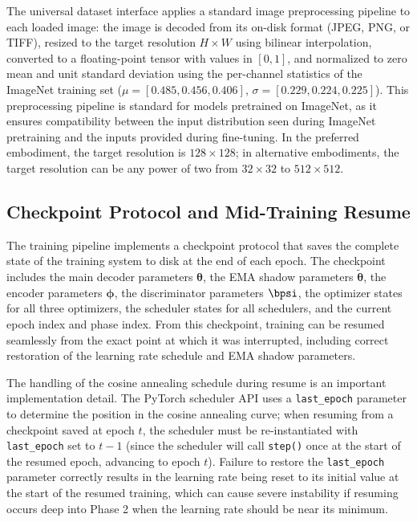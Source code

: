 \documentclass[12pt,letterpaper]{article}
\newcommand{\btheta}{\bm{\theta}}
\newcommand{\bphi}{\bm{\phi}}
\begin{document}
The universal dataset interface applies a standard image preprocessing pipeline
to each loaded image: the image is decoded from its on-disk format (JPEG, PNG,
or TIFF), resized to the target resolution $H \times W$ using bilinear
interpolation, converted to a floating-point tensor with values in $[0,1]$,
and normalized to zero mean and unit standard deviation using the per-channel
statistics of the ImageNet training set ($\mu = [0.485, 0.456, 0.406]$,
$\sigma = [0.229, 0.224, 0.225]$). This preprocessing pipeline is standard for
models pretrained on ImageNet, as it ensures compatibility between the input
distribution seen during ImageNet pretraining and the inputs provided during
fine-tuning. In the preferred embodiment, the target resolution is $128 \times
128$; in alternative embodiments, the target resolution can be any power of two
from $32 \times 32$ to $512 \times 512$.

\subsection{Checkpoint Protocol and Mid-Training Resume}

The training pipeline implements a checkpoint protocol that saves the complete
state of the training system to disk at the end of each epoch. The checkpoint
includes the main decoder parameters $\btheta$, the EMA shadow parameters
$\tilde{\btheta}$, the encoder parameters $\bphi$, the discriminator parameters
$\bpsi$, the optimizer states for all three optimizers, the scheduler states
for all schedulers, and the current epoch index and phase index. From this
checkpoint, training can be resumed seamlessly from the exact point at which
it was interrupted, including correct restoration of the learning rate schedule
and EMA shadow parameters.

The handling of the cosine annealing schedule during resume is an important
implementation detail. The PyTorch scheduler API uses a \texttt{last\_epoch}
parameter to determine the position in the cosine annealing curve; when
resuming from a checkpoint saved at epoch $t$, the scheduler must be
re-instantiated with \texttt{last\_epoch} set to $t - 1$ (since the scheduler
will call \texttt{step()} once at the start of the resumed epoch, advancing
to epoch $t$). Failure to restore the \texttt{last\_epoch} parameter correctly
results in the learning rate being reset to its initial value at the start of
the resumed training, which can cause severe instability if resuming occurs
deep into Phase 2 when the learning rate should be near its minimum.
\end{document}
